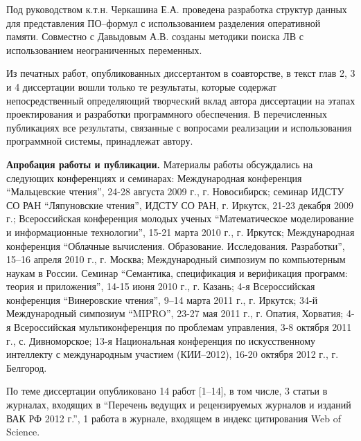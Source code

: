 \documentclass[a4paper]{report}
\begin{document}
Под руководством к.т.н. Черкашина Е.А. проведена разработка структур данных для представления ПО--формул с использованием разделения оперативной памяти. Совместно с Давыдовым А.В. созданы методики поиска ЛВ с использованием неограниченных переменных.

Из печатных работ, опубликованных диссертантом в соавторстве, в текст глав 2, 3 и 4 диссертации вошли только те результаты, которые содержат непосредственный определяющий творческий вклад автора диссертации на этапах проектирования и разработки программного обеспечения. В перечисленных публикациях все результаты, связанные с вопросами реализации и использования программной системы, принадлежат автору.



\textbf{Апробация работы и публикации.}
Материалы работы обсуждались на следующих конференциях и семинарах:
Международная конференция ``Мальцевские чтения'', 24-28 августа 2009 г., г. Новосибирск;
семинар ИДСТУ СО РАН ``Ляпуновские чтения'', ИДСТУ СО РАН, г. Иркутск, 21-23 декабря 2009 г.;
Всероссийская конференция молодых ученых ``Математическое моделирование и информационные технологии'', 15-21 марта 2010 г., г. Иркутск;
Международная конференция ``Облачные вычисления. Образование. Исследования. Разработки'', 15--16 апреля 2010 г., г. Москва;
Международный симпозиум по компьютерным наукам в России. Семинар ``Семантика, спецификация и верификация программ: теория и приложения'', 14-15 июня 2010 г., г. Казань;
4-я Всероссийская конференция ``Винеровские чтения'', 9--14 марта 2011 г., г. Иркутск;
34-й Международный симпозиум ``MIPRO'', 23-27 мая 2011 г., г. Опатия, Хорватия;
4-я Всероссийская мультиконференция по проблемам управления,  3-8 октября 2011 г., с. Дивноморское;
13-я Национальная конференция по искусственному интеллекту с международным участием (КИИ--2012), 16-20 октября 2012 г., г. Белгород.

По теме диссертации опубликовано 14 работ [1--14], в том числе, 3 статьи в журналах, входящих в ``Перечень ведущих и рецензируемых журналов и изданий ВАК РФ 2012 г.'', 1 работа в журнале, входящем в индекс цитирования Web of Science.





\end{document}
